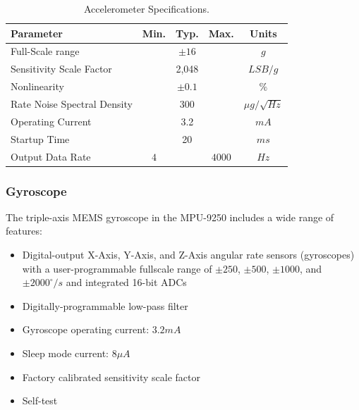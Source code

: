 \begin{table}[H]
    \begin{center}
        \begin{tabular}[t]{lcccc}
            \hline
            Parameter                   & Min. & Typ.      & Max.   & Units             \\
            \hline
            Full-Scale range            &      & $\pm 16$  &        & $g$               \\
            Sensitivity Scale Factor    &      & 2,048     &        & $LSB/g$           \\
            Nonlinearity                &      & $\pm 0.1$ &        & $\%$              \\
            Rate Noise Spectral Density &      & 300       &        & $\mu g/\sqrt{Hz}$ \\
            Operating Current           &      & 3.2       &        & $mA$              \\
            Startup Time                &      & 20        &        & $ms$              \\
            Output Data Rate            & $4$  &           & $4000$ & $Hz$              \\
            \hline
        \end{tabular}
        \caption{Accelerometer Specifications. }
        \label{tab:accelerometer_specification}
    \end{center}
\end{table}

\subsubsection{Gyroscope}

The triple-axis MEMS gyroscope in the MPU-9250 includes a wide range of features:

\begin{itemize}
    \item Digital-output X-Axis, Y-Axis, and Z-Axis angular rate sensors (gyroscopes) with a user-programmable fullscale range of $\pm 250$, $\pm 500$, $\pm 1000$, and $\pm 2000^{\circ}/s$ and integrated 16-bit ADCs
    \item Digitally-programmable low-pass filter
    \item Gyroscope operating current: $3.2mA$
    \item Sleep mode current: $8 \mu A$
    \item Factory calibrated sensitivity scale factor
    \item Self-test
\end{itemize}


